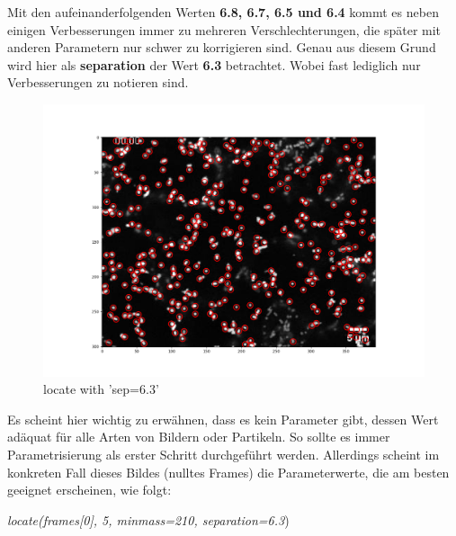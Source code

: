 \begin{enumerate}
Mit den aufeinanderfolgenden Werten \textbf{6.8, 6.7, 6.5 und 6.4} kommt es neben einigen Verbesserungen immer zu mehreren Verschlechterungen, die später mit anderen Parametern nur schwer zu korrigieren sind. 
Genau aus diesem Grund wird hier als  \textbf{separation} der Wert \textbf{6.3} betrachtet.
Wobei fast lediglich nur Verbesserungen zu notieren sind. 
\begin{figure}[H]
    \centering
    \includegraphics[scale=0.35]{Grafiken/trackpyBilder/locate_with_separation_(6,3).png}
    \caption{locate with 'sep=6.3'}
\end{figure}


\end{enumerate}


Es scheint hier wichtig zu erwähnen, dass es kein Parameter gibt, dessen Wert adäquat für alle Arten von Bildern oder Partikeln. So sollte es immer Parametrisierung als erster Schritt durchgeführt werden.
Allerdings scheint im konkreten Fall dieses Bildes (nulltes Frames) die Parameterwerte, die am besten geeignet erscheinen, wie folgt: \\
\begin{center}
{\large \textit{locate(frames[0], 5, minmass=210, separation=6.3})}
\end{center}

